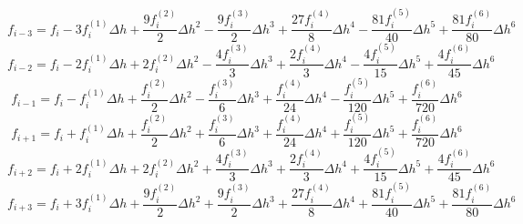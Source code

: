 \begin{equation} 
f_{{i-3}} = f_{i} - 3 f^{{(1)}}_{i} {\Delta h} + \frac{9 f^{{(2)}}_{i}}{2} {\Delta h}^{2} - \frac{9 f^{{(3)}}_{i}}{2} {\Delta h}^{3} + \frac{27 f^{{(4)}}_{i}}{8} {\Delta h}^{4} - \frac{81 f^{{(5)}}_{i}}{40} {\Delta h}^{5} + \frac{81 f^{{(6)}}_{i}}{80} {\Delta h}^{6}
 \end{equation} 
\begin{equation} 
f_{{i-2}} = f_{i} - 2 f^{{(1)}}_{i} {\Delta h} + 2 f^{{(2)}}_{i} {\Delta h}^{2} - \frac{4 f^{{(3)}}_{i}}{3} {\Delta h}^{3} + \frac{2 f^{{(4)}}_{i}}{3} {\Delta h}^{4} - \frac{4 f^{{(5)}}_{i}}{15} {\Delta h}^{5} + \frac{4 f^{{(6)}}_{i}}{45} {\Delta h}^{6}
 \end{equation} 
\begin{equation} 
f_{{i-1}} = f_{i} - f^{{(1)}}_{i} {\Delta h} + \frac{f^{{(2)}}_{i}}{2} {\Delta h}^{2} - \frac{f^{{(3)}}_{i}}{6} {\Delta h}^{3} + \frac{f^{{(4)}}_{i}}{24} {\Delta h}^{4} - \frac{f^{{(5)}}_{i}}{120} {\Delta h}^{5} + \frac{f^{{(6)}}_{i}}{720} {\Delta h}^{6}
 \end{equation} 
\begin{equation} 
f_{{i+1}} = f_{i} + f^{{(1)}}_{i} {\Delta h} + \frac{f^{{(2)}}_{i}}{2} {\Delta h}^{2} + \frac{f^{{(3)}}_{i}}{6} {\Delta h}^{3} + \frac{f^{{(4)}}_{i}}{24} {\Delta h}^{4} + \frac{f^{{(5)}}_{i}}{120} {\Delta h}^{5} + \frac{f^{{(6)}}_{i}}{720} {\Delta h}^{6}
 \end{equation} 
\begin{equation} 
f_{{i+2}} = f_{i} + 2 f^{{(1)}}_{i} {\Delta h} + 2 f^{{(2)}}_{i} {\Delta h}^{2} + \frac{4 f^{{(3)}}_{i}}{3} {\Delta h}^{3} + \frac{2 f^{{(4)}}_{i}}{3} {\Delta h}^{4} + \frac{4 f^{{(5)}}_{i}}{15} {\Delta h}^{5} + \frac{4 f^{{(6)}}_{i}}{45} {\Delta h}^{6}
 \end{equation} 
\begin{equation} 
f_{{i+3}} = f_{i} + 3 f^{{(1)}}_{i} {\Delta h} + \frac{9 f^{{(2)}}_{i}}{2} {\Delta h}^{2} + \frac{9 f^{{(3)}}_{i}}{2} {\Delta h}^{3} + \frac{27 f^{{(4)}}_{i}}{8} {\Delta h}^{4} + \frac{81 f^{{(5)}}_{i}}{40} {\Delta h}^{5} + \frac{81 f^{{(6)}}_{i}}{80} {\Delta h}^{6}
 \end{equation} 
